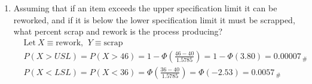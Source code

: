 \begin{enumerate}
    \item Assuming that if an item exceeds the upper specification limit it can be reworked, and if it is below the lower specification limit it must be scrapped, what percent scrap and rework is the process producing?
        \begin{align*}
            &\text{Let} \ X \equiv \text{rework, }\ Y \equiv \text{scrap}\\
            &P(X > USL) = P(X > 46) = 1 - \Phi\left(\frac{46 - 40}{1.5785}\right) = 1 - \Phi(3.80) = 0.00007_{\ \#}\\
            &P(X < LSL) = P(X < 36) = \Phi\left(\frac{36 - 40}{1.5785}\right) = \Phi(-2.53) = 0.0057_{\ \#}\\
        \end{align*}

\end{enumerate}